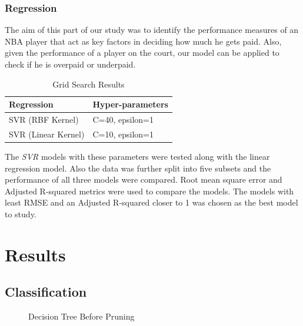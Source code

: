 \documentclass{article}
\begin{document}
\subsubsection{Regression}

The aim of this part of our study was to identify the performance measures of an NBA player that act as key factors in deciding how much he gets paid.
Also, given the performance of a player on the court, our model can be applied to check if he is overpaid or underpaid.

\begin{table}[H]
\caption{Grid Search Results}
  \label{GridSearch}
  \centering
\begin{tabular}{@{}ll@{}}
\toprule
Regression                & Hyper-parameters  \\ \midrule
SVR (RBF Kernel)            & C=40, epsilon=1           \\
SVR (Linear Kernel)       & C=10,   epsilon=1           \\
\bottomrule
\end{tabular}
\end{table}

The \textit{SVR} models with these parameters were tested along with the linear regression model.
Also the data was further split into five subsets and the performance of all three models were compared. 
Root mean square error and Adjusted R-squared metrics were used to compare the models. 
The models with least RMSE and an Adjusted R-squared closer to 1 was chosen as the best model to study.

\section{Results}

\subsection{Classification}

\begin{figure}[H]
	\caption{\label{fig:my-label}Decision Tree Before Pruning}
\end{figure}
\end{document}
